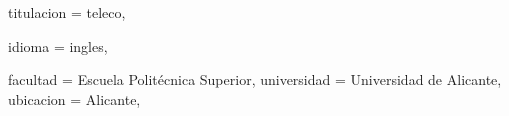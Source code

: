 {  %
  titulacion = teleco,
  
  idioma = ingles,
  
  
  facultad = {Escuela Politécnica Superior},
  universidad = {Universidad de Alicante},
  ubicacion = {Alicante},
  
}
